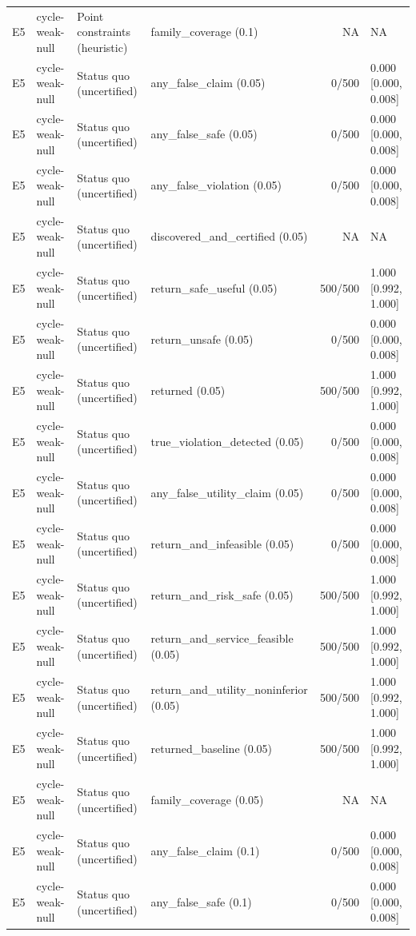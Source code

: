 \begin{longtable}{p{.04\linewidth}p{.18\linewidth}p{.19\linewidth}p{.16\linewidth}r p{.21\linewidth}}
E5 & cycle-weak-null & Point constraints (heuristic) & family\_coverage (0.1) & NA & NA\\
E5 & cycle-weak-null & Status quo (uncertified) & any\_false\_claim (0.05) & 0/500 & 0.000 [0.000, 0.008]\\
E5 & cycle-weak-null & Status quo (uncertified) & any\_false\_safe (0.05) & 0/500 & 0.000 [0.000, 0.008]\\
E5 & cycle-weak-null & Status quo (uncertified) & any\_false\_violation (0.05) & 0/500 & 0.000 [0.000, 0.008]\\
E5 & cycle-weak-null & Status quo (uncertified) & discovered\_and\_certified (0.05) & NA & NA\\
E5 & cycle-weak-null & Status quo (uncertified) & return\_safe\_useful (0.05) & 500/500 & 1.000 [0.992, 1.000]\\
E5 & cycle-weak-null & Status quo (uncertified) & return\_unsafe (0.05) & 0/500 & 0.000 [0.000, 0.008]\\
E5 & cycle-weak-null & Status quo (uncertified) & returned (0.05) & 500/500 & 1.000 [0.992, 1.000]\\
E5 & cycle-weak-null & Status quo (uncertified) & true\_violation\_detected (0.05) & 0/500 & 0.000 [0.000, 0.008]\\
E5 & cycle-weak-null & Status quo (uncertified) & any\_false\_utility\_claim (0.05) & 0/500 & 0.000 [0.000, 0.008]\\
E5 & cycle-weak-null & Status quo (uncertified) & return\_and\_infeasible (0.05) & 0/500 & 0.000 [0.000, 0.008]\\
E5 & cycle-weak-null & Status quo (uncertified) & return\_and\_risk\_safe (0.05) & 500/500 & 1.000 [0.992, 1.000]\\
E5 & cycle-weak-null & Status quo (uncertified) & return\_and\_service\_feasible (0.05) & 500/500 & 1.000 [0.992, 1.000]\\
E5 & cycle-weak-null & Status quo (uncertified) & return\_and\_utility\_noninferior (0.05) & 500/500 & 1.000 [0.992, 1.000]\\
E5 & cycle-weak-null & Status quo (uncertified) & returned\_baseline (0.05) & 500/500 & 1.000 [0.992, 1.000]\\
E5 & cycle-weak-null & Status quo (uncertified) & family\_coverage (0.05) & NA & NA\\
E5 & cycle-weak-null & Status quo (uncertified) & any\_false\_claim (0.1) & 0/500 & 0.000 [0.000, 0.008]\\
E5 & cycle-weak-null & Status quo (uncertified) & any\_false\_safe (0.1) & 0/500 & 0.000 [0.000, 0.008]\\

\end{longtable}

